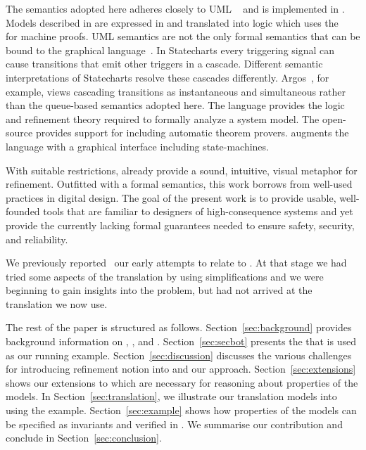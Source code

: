 The semantics adopted here adheres closely to UML \Statecharts~\cite{Alexandre} and is implemented in \iUMLB.
 Models described in \Statecharts are expressed in \SCXML and
 translated into \EventB logic which uses the \Rodin~\cite{Abrial} for
 machine proofs.  UML \Statechart semantics are not the only formal
 semantics that can be bound to the \Statechart graphical
 language~\cite{Eshuis_2009}.  In Statecharts every triggering signal
 can cause transitions that emit other triggers in a cascade.
 Different semantic interpretations of Statecharts resolve these
 cascades differently.  Argos~\cite{Maraninchi91theargos}, for
 example, views cascading transitions as instantaneous and
 simultaneous rather than the queue-based semantics adopted here.
%
The \EventB language
\cite{abrial10:_model_event_b} provides the logic and refinement
theory required to formally analyze a system model.  The open-source
\Rodin \cite{abrial10:_rodin} provides support for \EventB
including automatic theorem provers.  \iUMLB
augments the \EventB language with a graphical interface including
state-machines.  

With suitable restrictions, \Statecharts already provide a sound,
intuitive, visual metaphor for refinement. Outfitted with a formal
semantics, this work borrows from well-used \Statechart practices in
digital design.  The goal of the present work is to provide usable,
well-founded tools that are familiar to designers of high-consequence
systems and yet provide the currently lacking formal guarantees needed
to ensure safety, security, and reliability.

We previously reported~\cite{Morris_2016} our early attempts to relate \Statecharts to \EventB. At that stage we had tried some aspects of the translation by using simplifications and we were beginning to gain insights into the problem, but had not arrived at the translation we now use.

The rest of the paper is structured as follows.  Section~\ref{sec:background} provides background information on \SCXML, \EventB, and \iUMLB.  Section~\ref{sec:secbot} presents the \IDS that is used as our running example.  Section~\ref{sec:discussion} discusses the various challenges for introducing refinement notion into \SCXML and our approach.  Section~\ref{sec:extensions} shows our extensions to \SCXML which are necessary for reasoning about properties of the \SCXML models.  In Section~\ref{sec:translation}, we illustrate our translation \SCXML models into \EventB using the \IDS example.  Section~\ref{sec:example} shows how properties of the \SCXML models can be specified as invariants and verified in \EventB.  We summarise our contribution and conclude in Section~\ref{sec:conclusion}.

